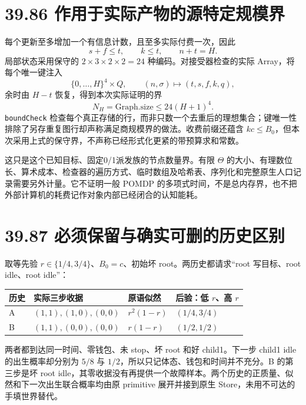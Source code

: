 \documentclass[
  11pt,
  oneside]{book}
\newcounter{none} %
\begin{document}
\section{39.86 作用于实际产物的源特定规模界}\label{ux4f5cux7528ux4e8eux5b9eux9645ux4ea7ux7269ux7684ux6e90ux7279ux5b9aux89c4ux6a21ux754c}

每个更新至多增加一个有信息计数，且至多实际付费一次，因此 \[s+f\le t,\qquad k\le t,\qquad n+t=H.\] 局部状态采用保守的 \(2\times3\times2\times2=24\) 种编码。对接受器检查的实际 Array，将每个唯一键注入 \[\{0,\ldots,H\}^4\times Q,\qquad(n,\sigma)\longmapsto(t,s,f,k,q),\] 余时由 \(H-t\) 恢复，得到本次实际证明的界 \[\boxed{N_H=\mathrm{Graph.size}\le24(H+1)^4.}\] \texttt{boundCheck} 检查每个真正存储的行，而非只数一个去重后的理想集合；键唯一性排除了另存重复图行却声称满足商规模界的做法。收费前缀还蕴含 \(kc\le B_0\)，但本次采用上式的保守界，不声称已经形式化更紧的带预算求和常数。

这只是这个已知目标、固定0/1派发族的节点数量界。有限 \(\Theta\) 的大小、有理数位长、算术成本、检查器的遍历方式、临时数组及哈希表、序列化和完整原生人口记录需要另外计量。它不证明一般 POMDP 的多项式时间，不是总内存界，也不把外部计算机的耗费记作对象内部已经闭合的认知能耗。

\section{39.87 必须保留与确实可删的历史区别}\label{ux5fc5ux987bux4fddux7559ux4e0eux786eux5b9eux53efux5220ux7684ux5386ux53f2ux533aux522b}

取等先验 \(r\in\{1/4,3/4\}\)、\(B_0=c\)、初始坏 root。两历史都请求``root 写目标、root idle、root idle''：

{\def\LTcaptype{none} %
\begin{longtable}[]{@{}llll@{}}
\toprule\noalign{}
历史 & 实际三步收据 & 原语似然 & 后验：低 \(r\)、高 \(r\) \\
\midrule\noalign{}
\endhead
\bottomrule\noalign{}
\endlastfoot
A & \((1,1),(1,0),(0,0)\) & \(r^2(1-r)\) & \((1/4,3/4)\) \\
B & \((1,1),(0,0),(0,0)\) & \(r(1-r)\) & \((1/2,1/2)\) \\
\end{longtable}
}

两者都到达同一时间、零钱包、未 stop、坏 root 和好 child1。下一步 child1 idle 的出生概率却分别为 \(5/8\) 与 \(1/2\)，所以只记体态、钱包和时间并不充分。B 的第三步是坏 root idle，其零收据没有再提供一个故障样本。两个历史的正质量、似然和下一次出生联合概率均由原 primitive 展开并接到原生 Store，未用不可达的手填世界替代。
\end{document}
